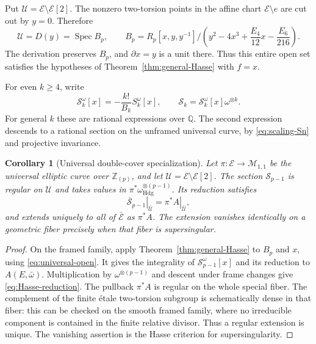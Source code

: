 \documentclass[11pt]{amsart}
\newtheorem{cor}[thm]{Corollary}
\theoremstyle{definition}
\theoremstyle{remark}
\numberwithin{equation}{section}
\begin{document}
Put $\mathcal U=\mathcal E\setminus\mathcal E[2]$. The nonzero
two-torsion points in the affine chart $\mathcal E\setminus e$ are
cut out by $y=0$. Therefore
\begin{equation}\label{eq:universal-open}
\mathcal U=D(y)=\operatorname{Spec}B_p,\qquad
B_p=R_p[x,y,y^{-1}]\big/
\left(y^2-4x^3+\frac{E_4}{12}x-\frac{E_6}{216}\right).
\end{equation}
The derivation preserves $B_p$, and $\partial x=y$ is a unit there.
Thus this entire open set satisfies the hypotheses of
Theorem~\ref{thm:general-Hasse} with $f=x$.

For even $k\geq4$, write
\begin{equation}\label{eq:normalized-S}
\mathcal S_k^\omega[x]= -\frac{k!}{B_k}S_k^\omega[x],
\qquad
\mathcal S_k=\mathcal S_k^\omega[x]\omega^{\otimes k}.
\end{equation}
For general $k$ these are rational expressions over $\mathbb Q$.
The second expression descends to a rational section on the unframed
universal curve, by \eqref{eq:scaling-Sn} and projective invariance.

\begin{cor}[Universal double-cover specialization]\label{cor:Hasse-reduction}
Let $\pi:\mathcal E\to\mathcal M_{1,1}$ be the universal elliptic
curve over $\mathbb Z_{(p)}$, and let
$\mathcal U=\mathcal E\setminus\mathcal E[2]$.
The section $\mathcal S_{p-1}$ is regular on $\mathcal U$ and takes
values in $\pi^*\omega_{\mathrm{Hdg}}^{\otimes(p-1)}$. Its reduction
satisfies
\begin{equation}\label{eq:Hasse-reduction}
\left.\overline{\mathcal S}_{p-1}\right|_{\bar{\mathcal U}}
=\left.\pi^*A\right|_{\bar{\mathcal U}},
\end{equation}
and extends uniquely to all of $\bar{\mathcal E}$ as $\pi^*A$.
The extension vanishes identically on a geometric fiber precisely
when that fiber is supersingular.
\end{cor}

\begin{proof}
On the framed family, apply Theorem~\ref{thm:general-Hasse} to
$B_p$ and $x$, using \eqref{eq:universal-open}. It gives the
integrality of $\mathcal S_{p-1}^\omega[x]$ and its reduction to
$A(E,\bar\omega)$. Multiplication by $\omega^{\otimes(p-1)}$ and
descent under frame changes give \eqref{eq:Hasse-reduction}.
The pullback $\pi^*A$ is regular on the whole special fiber.
The complement of the finite \'etale two-torsion subgroup is
schematically dense in that fiber: this can be checked on the smooth
framed family, where no irreducible component is contained in the
finite relative divisor. Thus a regular extension is unique.
The vanishing assertion is the Hasse criterion for supersingularity.
\end{proof}
\end{document}
